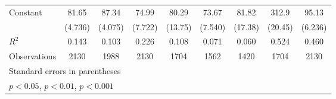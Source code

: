 \documentclass{article}
\begin{document}
{\begin{longtable}{l*{8}{c}}
Constant        &    81.65\sym{***}&    87.34\sym{***}&    74.99\sym{***}&    80.29\sym{***}&    73.67\sym{***}&    81.82\sym{**} &    312.9\sym{***}&    95.13\sym{***}\\
                &  (4.736)         &  (4.075)         &  (7.722)         &  (13.75)         &  (7.540)         &  (17.38)         &  (20.45)         &  (6.236)         \\
\hline
\(R^{2}\)       &    0.143         &    0.103         &    0.226         &    0.108         &    0.071         &    0.060         &    0.524         &    0.460         \\
Observations    &     2130         &     1988         &     2130         &     1704         &     1562         &     1420         &     1704         &     2130         \\
\hline\hline
\multicolumn{9}{l}{\footnotesize Standard errors in parentheses}\\
\multicolumn{9}{l}{\footnotesize \sym{*} \(p<0.05\), \sym{**} \(p<0.01\), \sym{***} \(p<0.001\)}\\
\end{longtable}
}
\end{document}
